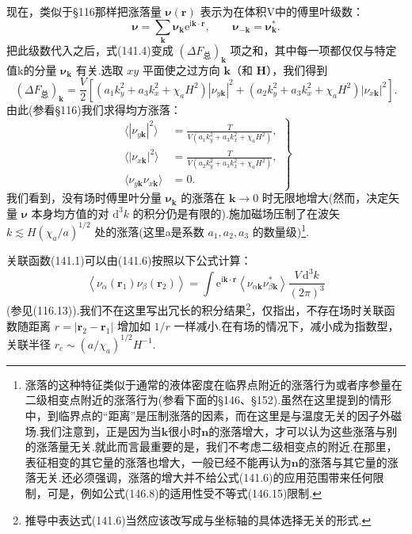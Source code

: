 现在，类似于§116那样把涨落量 $\boldsymbol{\nu}(\boldsymbol{r})$ 表示为在体积V中的傅里叶级数：
\begin{equation}
  \boldsymbol{\nu}=\sum_{\boldsymbol{k}}\boldsymbol{\nu}_{\boldsymbol{k}}
  \mathrm{e}^{\mathrm{i}\boldsymbol{k}\cdot\boldsymbol{r}},\qquad
  \boldsymbol{\nu}_{-\boldsymbol{k}}=\boldsymbol{\nu}_{\boldsymbol{k}}^{*}.
\end{equation}
把此级数代入之后，式(141.4)变成 $(\Delta F_{\text{总}})_{\boldsymbol{k}}$ 项之和，其中每一项都仅仅与特定值k的分量 $\boldsymbol{\nu}_{\boldsymbol{k}}$ 有关.选取 $xy$ 平面使之过方向 $\boldsymbol{k}$（和 $\boldsymbol{H}$），我们得到
\begin{equation*}
  (\Delta F_{\text{总}})_{\boldsymbol{k}}=\frac{V}{2}\left[
  (a_1k_y^2+a_3k_x^2+\chi_aH^2)|\nu_{y\boldsymbol{k}}|^2
  +(a_2k_y^2+a_3k_x^2+\chi_aH^2)|\nu_{x\boldsymbol{k}}|^2\right].
\end{equation*}
由此(参看§116)我们求得均方涨落：
\begin{equation}
  \left.\begin{aligned}
    \langle|\nu_{y\boldsymbol{k}}|^2\rangle
    &=\frac{T}{V(a_1k_y^2+a_3k_x^2+\chi_aH^2)},\\
    \langle|\nu_{x\boldsymbol{k}}|^2\rangle
    &=\frac{T}{V(a_2k_y^2+a_3k_x^2+\chi_aH^2)},\\
    \langle\nu_{y\boldsymbol{k}}\nu_{x\boldsymbol{k}}\rangle
    &=0.
  \end{aligned}\right\}
\end{equation}
我们看到，没有场时傅里叶分量 $\boldsymbol{\nu}_{\boldsymbol{k}}$ 的涨落在 $\boldsymbol{k}\to0$ 时无限地增大(然而，决定矢量 $\boldsymbol{\nu}$ 本身均方值的对 $\mathrm{d}^3k$ 的积分仍是有限的).施加磁场压制了在波矢 $k\lesssim H(\chi_a/a)^{1/2}$ 处的涨落(这里a是系数 $a_1,a_2,a_3$ 的数量级)\footnote{涨落的这种特征类似于通常的液体密度在临界点附近的涨落行为或者序参量在二级相变点附近的涨落行为(参看下面的§146、§152).虽然在这里提到的情形中，到临界点的“距离”是压制涨落的因素，而在这里是与温度无关的因子外磁场.我们注意到，正是因为当$\boldsymbol{k}$很小时$\boldsymbol{n}$的涨落增大，才可以认为这些涨落与别的涨落量无关.就此而言最重要的是，我们不考虑二级相变点的附近.在那里，表征相变的其它量的涨落也增大，一般已经不能再认为$\boldsymbol{n}$的涨落与其它量的涨落无关.还必须强调，涨落的增大并不给公式(141.6)的应用范围带来任何限制，可是，例如公式(146.8)的适用性受不等式(146.15)限制.}.

关联函数(141.1)可以由(141.6)按照以下公式计算：
\begin{equation}
  \left\langle\nu_\alpha(\boldsymbol{r}_1)\nu_\beta(\boldsymbol{r}_2)\right\rangle
  =\int\mathrm{e}^{\mathrm{i}\boldsymbol{k}\cdot\boldsymbol{r}}
  \left\langle\nu_{\alpha\boldsymbol{k}}\nu_{\beta\boldsymbol{k}}^{*}\right\rangle
  \frac{V\,\mathrm{d}^3k}{(2\pi)^3}
\end{equation}
(参见(116.13)).我们不在这里写出冗长的积分结果\footnote{推导中表达式(141.6)当然应该改写成与坐标轴的具体选择无关的形式.}，仅指出，不存在场时关联函数随距离 $r=|\boldsymbol{r}_2-\boldsymbol{r}_1|$ 增加如 $1/r$ 一样减小.在有场的情况下，减小成为指数型，关联半径 $r_c\sim(a/\chi_a)^{1/2}H^{-1}$.

